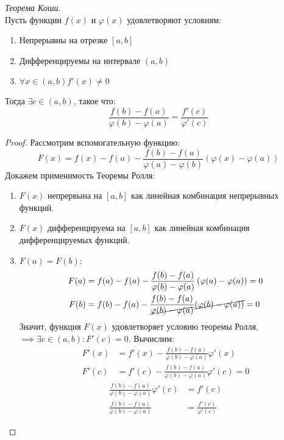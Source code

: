 \begin{theorem}
  \textit{Теорема Коши}. \\
  Пусть функции $f(x)$ и  $\varphi(x)$ удовлетворяют условиям: 
  \begin{enumerate}
    \item Непрерывны на отрезке $[a, b]$
    \item Дифференцируемы на интервале  $(a, b)$ 
    \item  $\forall x \in (a, b) f'(x) \neq 0$
  \end{enumerate}
  Тогда $\exists  c \in (a, b)$, такое что: \[
    \boxed{\frac{f(b) - f(a)}{\varphi(b) - \varphi(a)} = \frac{f'(c)}{\varphi'(c)}}
  \] 
\end{theorem}
\begin{proof}
  Рассмотрим вспомогательную функцию: \[
    F(x) = f(x) - f(a) - \frac{f(b) - f(a)}{\varphi(a) - \varphi(b)}(\varphi(x) - \varphi(a))
  \]
  Докажем применимость Теоремы Ролля:
  \begin{enumerate}
    \item $F(x)$ непрервына на $[a, b]$ как линейная комбинация непрерывных функций.
    \item  $F(x)$ дифференцируема на $[a, b]$ как линейная комбинация дифференцируемых функций.
    \item  $F(a) = F(b)$:
      \begin{align*}
        F(a) &= f(a) - f(a) - \frac{f(b) - f(a)}{\varphi(b) - \varphi(a)}\left( \varphi(a) - \varphi(a) \right) = 0 \\ 
        F(b) &= f(b) - f(a) - \frac{f(b) - f(a)}{\cancel{\varphi(b) - \varphi(a)}}\cancel{\left( \varphi(b) - \varphi(a) \right)} = 0
      \end{align*}
    Значит, функция $F(x)$ удовлетворяет условию теоремы Ролля, $\implies \exists  c \in (a, b) : F'(c) = 0$. Вычислим:
    \begin{align*}
      F'(x) &= f'(x) - \frac{f(b) - f(a)}{\varphi(b) - \varphi(a)} \varphi'(x) \\ 
      F'(c) &= f'(c) - \frac{f(b) - f(a)}{\varphi(b) - \varphi(a)} \varphi'(c) = 0
    \end{align*}
    \begin{align*}
      \frac{f(b) - f(a)}{\varphi(b) - \varphi(a)} \varphi'(c) &= f'(c) \\
      \frac{f(b) - f(a)}{\varphi(b) - \varphi(a)} &= \frac{f'(c)}{\varphi'(c)}
    \end{align*}
  \end{enumerate}
\end{proof}

